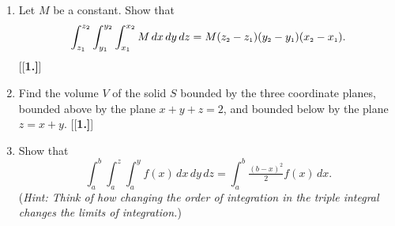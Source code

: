 \begin{enumerate}[\bfseries 1.]
 \item Let $M$ be a constant. Show that \[\int_{z_{\scriptscriptstyle 1}}^{z_{\scriptscriptstyle 2}} \int_{y_{\scriptscriptstyle 1}}^{y_{\scriptscriptstyle 2}}
  \int_{x_{\scriptscriptstyle 1}}^{x_{\scriptscriptstyle 2}} M\,dx\,dy\,dz = M(z_{\scriptscriptstyle 2} - z_{\scriptscriptstyle 1})(y_{\scriptscriptstyle 2} - y_{\scriptscriptstyle 1})
  (x_{\scriptscriptstyle 2} - x_{\scriptscriptstyle 1}).\]
[{[\bfseries 1.]}]
 \item Find the volume $V$ of the solid $S$ bounded by the three coordinate planes, bounded above by the plane
  $x+y+z=2$, and bounded below by the plane $z=x+y$.
[{[\bfseries 1.]}]
 \item Show that 
 \[\displaystyle\int_a^b \displaystyle\int_a^z \displaystyle\int_a^y f(x)\,dx\,dy\,dz =
  \displaystyle\int_a^b \tfrac{(b-x)^2 }{2} f(x)\,dx.\] 
  (\emph{Hint: Think of how changing the order of integration in
  the triple integral changes the limits of integration.})
\end{enumerate}
\newpage
